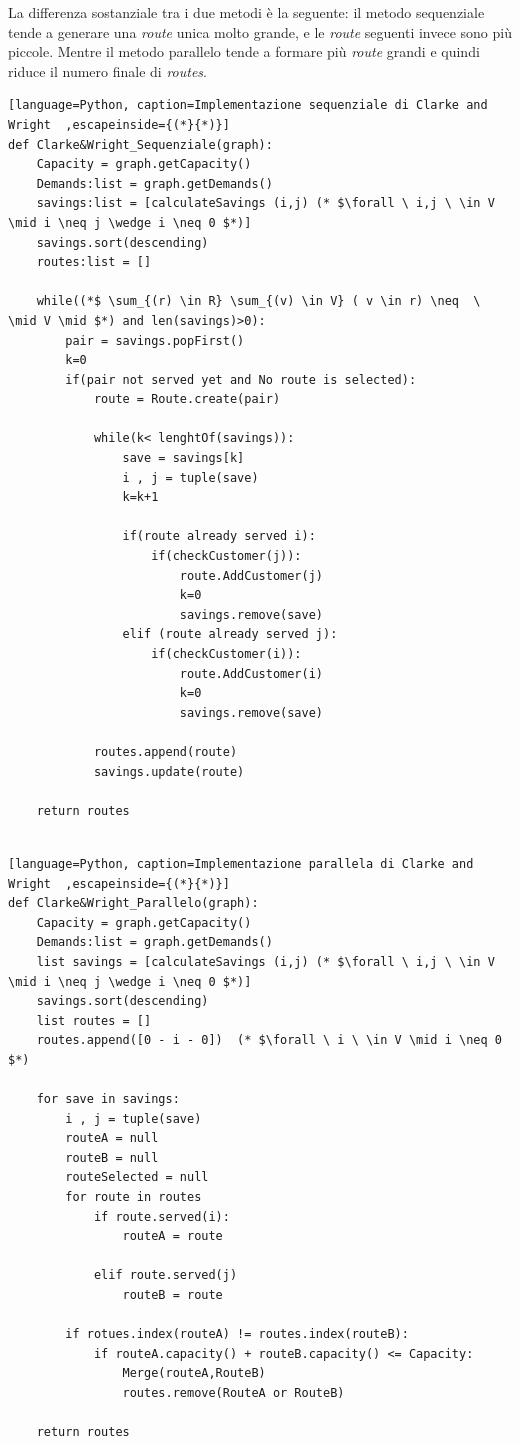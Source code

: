 \documentclass[]{article}
\begin{document}
La differenza sostanziale tra i due metodi è la seguente: il metodo sequenziale tende a generare una \emph{route} unica molto grande, e le \emph{route} seguenti invece sono più piccole. Mentre il metodo parallelo tende a formare più \emph{route} grandi e quindi riduce il numero finale di \emph{routes}.

\begin{lstlisting}[language=Python, caption=Implementazione sequenziale di Clarke and Wright  ,escapeinside={(*}{*)}]
def Clarke&Wright_Sequenziale(graph):
	Capacity = graph.getCapacity()
	Demands:list = graph.getDemands()
	savings:list = [calculateSavings (i,j) (* $\forall \ i,j \ \in V \mid i \neq j \wedge i \neq 0 $*)]
	savings.sort(descending)
	routes:list = []
	
	while((*$ \sum_{(r) \in R} \sum_{(v) \in V} ( v \in r) \neq  \ \mid V \mid $*) and len(savings)>0):
		pair = savings.popFirst()
		k=0
		if(pair not served yet and No route is selected):
			route = Route.create(pair)
			
			while(k< lenghtOf(savings)):
				save = savings[k]
				i , j = tuple(save)
				k=k+1
				
				if(route already served i):
					if(checkCustomer(j)):
						route.AddCustomer(j)
						k=0
						savings.remove(save)							
				elif (route already served j):
					if(checkCustomer(i)):
						route.AddCustomer(i)
						k=0
						savings.remove(save)				
					
			routes.append(route)
			savings.update(route)
					
	return routes	
				
\end{lstlisting}


\begin{lstlisting}[language=Python, caption=Implementazione parallela di Clarke and Wright  ,escapeinside={(*}{*)}]
def Clarke&Wright_Parallelo(graph):
	Capacity = graph.getCapacity()
	Demands:list = graph.getDemands()
	list savings = [calculateSavings (i,j) (* $\forall \ i,j \ \in V \mid i \neq j \wedge i \neq 0 $*)]
	savings.sort(descending)
	list routes = []
	routes.append([0 - i - 0])  (* $\forall \ i \ \in V \mid i \neq 0 $*) 
	
	for save in savings:
		i , j = tuple(save)
		routeA = null
		routeB = null
		routeSelected = null
		for route in routes
			if route.served(i):
				routeA = route

			elif route.served(j)
				routeB = route
					    
		if rotues.index(routeA) != routes.index(routeB):
			if routeA.capacity() + routeB.capacity() <= Capacity:
				Merge(routeA,RouteB) 
				routes.remove(RouteA or RouteB)
				
	return routes
\end{lstlisting}
\end{document}
